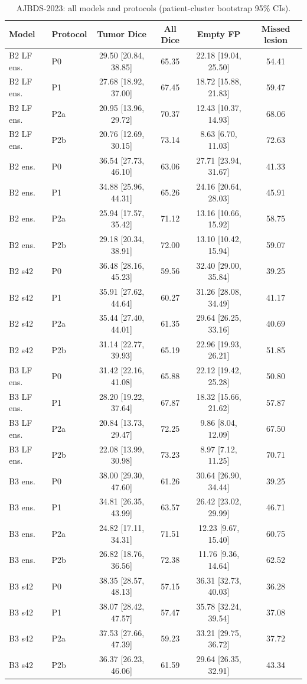 \begin{table}[!ht]
\centering
\scriptsize
\caption{AJBDS-2023: all models and protocols (patient-cluster bootstrap 95\% CIs).}
\label{tab:s-ajbds}
\begin{tabular}{llcccc}
\toprule
Model & Protocol & Tumor Dice & All Dice & Empty FP & Missed lesion \\
\midrule
B2 LF ens. & P0 & 29.50 [20.84, 38.85] & 65.35 & 22.18 [19.04, 25.50] & 54.41 \\
B2 LF ens. & P1 & 27.68 [18.92, 37.00] & 67.45 & 18.72 [15.88, 21.83] & 59.47 \\
B2 LF ens. & P2a & 20.95 [13.96, 29.72] & 70.37 & 12.43 [10.37, 14.93] & 68.06 \\
B2 LF ens. & P2b & 20.76 [12.69, 30.15] & 73.14 & 8.63 [6.70, 11.03] & 72.63 \\
B2 ens. & P0 & 36.54 [27.73, 46.10] & 63.06 & 27.71 [23.94, 31.67] & 41.33 \\
B2 ens. & P1 & 34.88 [25.96, 44.31] & 65.26 & 24.16 [20.64, 28.03] & 45.91 \\
B2 ens. & P2a & 25.94 [17.57, 35.42] & 71.12 & 13.16 [10.66, 15.92] & 58.75 \\
B2 ens. & P2b & 29.18 [20.34, 38.91] & 72.00 & 13.10 [10.42, 15.94] & 59.07 \\
B2 s42 & P0 & 36.48 [28.16, 45.23] & 59.56 & 32.40 [29.00, 35.84] & 39.25 \\
B2 s42 & P1 & 35.91 [27.62, 44.64] & 60.27 & 31.26 [28.08, 34.49] & 41.17 \\
B2 s42 & P2a & 35.44 [27.40, 44.01] & 61.35 & 29.64 [26.25, 33.16] & 40.69 \\
B2 s42 & P2b & 31.14 [22.77, 39.93] & 65.19 & 22.96 [19.93, 26.21] & 51.85 \\
B3 LF ens. & P0 & 31.42 [22.16, 41.08] & 65.88 & 22.12 [19.42, 25.28] & 50.80 \\
B3 LF ens. & P1 & 28.20 [19.22, 37.64] & 67.87 & 18.32 [15.66, 21.62] & 57.87 \\
B3 LF ens. & P2a & 20.84 [13.73, 29.47] & 72.25 & 9.86 [8.04, 12.09] & 67.50 \\
B3 LF ens. & P2b & 22.08 [13.99, 30.98] & 73.23 & 8.97 [7.12, 11.25] & 70.71 \\
B3 ens. & P0 & 38.00 [29.30, 47.60] & 61.26 & 30.64 [26.90, 34.44] & 39.25 \\
B3 ens. & P1 & 34.81 [26.35, 43.99] & 63.57 & 26.42 [23.02, 29.99] & 46.71 \\
B3 ens. & P2a & 24.82 [17.11, 34.31] & 71.51 & 12.23 [9.67, 15.40] & 60.75 \\
B3 ens. & P2b & 26.82 [18.76, 36.56] & 72.38 & 11.76 [9.36, 14.64] & 62.52 \\
B3 s42 & P0 & 38.35 [28.57, 48.13] & 57.15 & 36.31 [32.73, 40.03] & 36.28 \\
B3 s42 & P1 & 38.07 [28.42, 47.57] & 57.47 & 35.78 [32.24, 39.54] & 37.08 \\
B3 s42 & P2a & 37.53 [27.66, 47.39] & 59.23 & 33.21 [29.75, 36.72] & 37.72 \\
B3 s42 & P2b & 36.37 [26.23, 46.06] & 61.59 & 29.64 [26.35, 32.91] & 43.34 \\
\bottomrule
\end{tabular}
\end{table}


